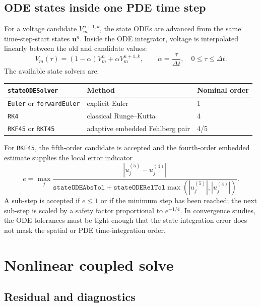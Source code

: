\documentclass[11pt,a4paper]{article}
\newcommand{\code}[1]{\texttt{\small #1}}
\newcommand{\Vm}{V_m}
\begin{document}
\subsection{ODE states inside one PDE time step}

For a voltage candidate $\Vm^{n+1,k}$, the state ODEs are advanced from the
same time-step-start states $\mathbf{u}^n$. Inside the ODE integrator, voltage
is interpolated linearly between the old and candidate values:
\begin{equation}
  \Vm(\tau)
  =
  (1-\alpha)\Vm^n+\alpha \Vm^{n+1,k},
  \qquad
  \alpha=\frac{\tau}{\Delta t},\quad 0\le \tau\le \Delta t.
  \label{eq:ode-vm-interpolation}
\end{equation}
The available state solvers are:
\begin{center}
\begin{tabular}{@{}lll@{}}
\toprule
\code{stateODESolver} & Method & Nominal order \\
\midrule
\code{Euler} or \code{forwardEuler} & explicit Euler & 1 \\
\code{RK4} & classical Runge--Kutta & 4 \\
\code{RKF45} or \code{RKT45} & adaptive embedded Fehlberg pair & 4/5 \\
\bottomrule
\end{tabular}
\end{center}
For \code{RKF45}, the fifth-order candidate is accepted and the fourth-order
embedded estimate supplies the local error indicator
\begin{equation}
  e =
  \max_j
  \frac{|u^{(5)}_j-u^{(4)}_j|}
       {\texttt{stateODEAbsTol}+
        \texttt{stateODERelTol}\max(|u^{(5)}_j|,|u^{(4)}_j|)}.
\end{equation}
A sub-step is accepted if $e\le 1$ or if the minimum step has been reached; the
next sub-step is scaled by a safety factor proportional to $e^{-1/4}$. In
convergence studies, the ODE tolerances must be tight enough that the state
integration error does not mask the spatial or PDE time-integration order.

\section{Nonlinear coupled solve}

\subsection{Residual and diagnostics}
\end{document}
